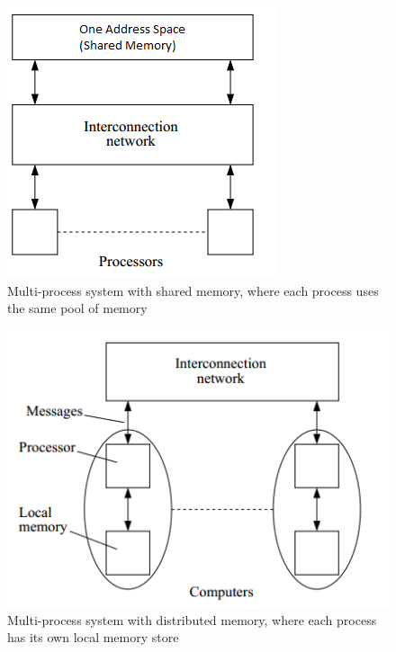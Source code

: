 \documentclass{article}
\begin{document}
\begin{figure}
	\centering
	\includegraphics[scale=0.7]{figures/shared-memory.png}
	\caption{Multi-process system with shared memory, where each process uses the same pool of memory}
	\label{fig:multi-process-shared-memory}
\end{figure}
\begin{figure}
	\centering
	\includegraphics[scale=0.7]{figures/distributed-memory.png}
	\caption{Multi-process system with distributed memory, where each process has its own local memory store}
	\label{fig:multi-process-distributed-memory}
\end{figure}
\end{document}
